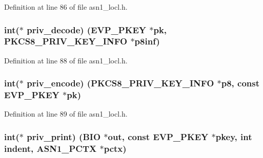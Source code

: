 Definition at line 86 of file asn1\+\_\+locl.\+h.

\subsubsection[{\texorpdfstring{priv\+\_\+decode}{priv_decode}}]{\setlength{\rightskip}{0pt plus 5cm}int($\ast$ priv\+\_\+decode) ({\bf E\+V\+P\+\_\+\+P\+K\+EY} $\ast$pk, {\bf P\+K\+C\+S8\+\_\+\+P\+R\+I\+V\+\_\+\+K\+E\+Y\+\_\+\+I\+N\+FO} $\ast$p8inf)}\hypertarget{structevp__pkey__asn1__method__st_a2744e6bc2473d3d562cfba707a35e617}{}\label{structevp__pkey__asn1__method__st_a2744e6bc2473d3d562cfba707a35e617}


Definition at line 88 of file asn1\+\_\+locl.\+h.

\subsubsection[{\texorpdfstring{priv\+\_\+encode}{priv_encode}}]{\setlength{\rightskip}{0pt plus 5cm}int($\ast$ priv\+\_\+encode) ({\bf P\+K\+C\+S8\+\_\+\+P\+R\+I\+V\+\_\+\+K\+E\+Y\+\_\+\+I\+N\+FO} $\ast$p8, const {\bf E\+V\+P\+\_\+\+P\+K\+EY} $\ast$pk)}\hypertarget{structevp__pkey__asn1__method__st_a87fb532b7fc31dd31a480a66f8a0300e}{}\label{structevp__pkey__asn1__method__st_a87fb532b7fc31dd31a480a66f8a0300e}


Definition at line 89 of file asn1\+\_\+locl.\+h.

\subsubsection[{\texorpdfstring{priv\+\_\+print}{priv_print}}]{\setlength{\rightskip}{0pt plus 5cm}int($\ast$ priv\+\_\+print) ({\bf B\+IO} $\ast$out, const {\bf E\+V\+P\+\_\+\+P\+K\+EY} $\ast$pkey, int indent, {\bf A\+S\+N1\+\_\+\+P\+C\+TX} $\ast$pctx)}\hypertarget{structevp__pkey__asn1__method__st_ae349b3ea59e0f76e051467114990ff96}{}\label{structevp__pkey__asn1__method__st_ae349b3ea59e0f76e051467114990ff96}


